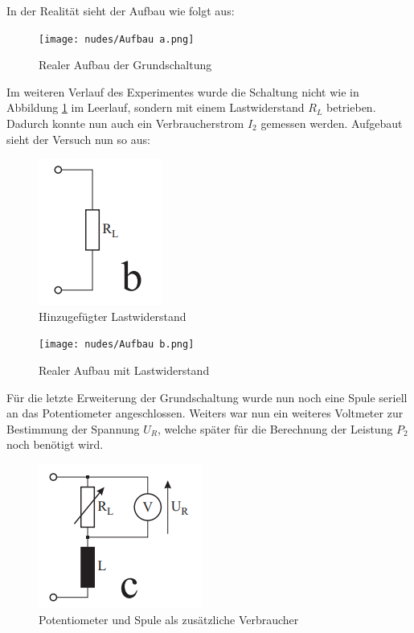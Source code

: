 \documentclass[12pt,a4paper,twoside]{article}
\begin{document}
\noindent
In der Realität sieht der Aufbau wie folgt aus:

\begin{figure}[H]
    \centering
    \texttt{[image: nudes/Aufbau a.png]}
    \caption{Realer Aufbau der Grundschaltung}
    \label{fig:RealerAufbauDerGrundschaltung}
\end{figure}

\noindent
Im weiteren Verlauf des Experimentes wurde die Schaltung nicht wie in Abbildung \ref{fig:RealerAufbauDerGrundschaltung} im Leerlauf, sondern mit einem Lastwiderstand $R_{L}$ betrieben. Dadurch konnte nun auch ein Verbraucherstrom $I_{2}$ gemessen werden. Aufgebaut sieht der Versuch nun so aus:

\begin{figure}[H]
    \centering
    \includegraphics[width=0.2\linewidth, angle=0]{nudes/Versuchsaufbau b.png}
    \caption{Hinzugefügter Lastwiderstand}
    \label{fig:AufbauB}
\end{figure}

\begin{figure}[H]
    \centering
    \texttt{[image: nudes/Aufbau b.png]}
    \caption{Realer Aufbau mit Lastwiderstand}
    \label{fig:RealerAufbauB}
\end{figure}

\noindent
Für die letzte Erweiterung der Grundschaltung wurde nun noch eine Spule seriell an das Potentiometer angeschlossen. Weiters war nun ein weiteres Voltmeter zur Bestimmung der Spannung $U_{R}$, welche später für die Berechnung der Leistung $P_{2}$ noch benötigt wird.

\begin{figure}[H]
    \centering
    \includegraphics[width=0.2\linewidth, angle=0]{nudes/Versuchsaufbau c.png}
    \caption{Potentiometer und Spule als zusätzliche Verbraucher}
    \label{fig:AufbauC}
\end{figure}
\end{document}
